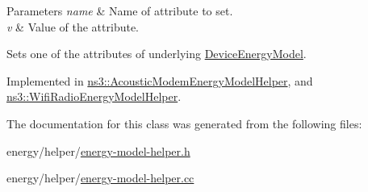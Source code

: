 \begin{DoxyParams}{Parameters}
{\em name} & Name of attribute to set. \\
\hline
{\em v} & Value of the attribute.\\
\hline
\end{DoxyParams}
Sets one of the attributes of underlying \hyperlink{classns3_1_1DeviceEnergyModel}{Device\+Energy\+Model}. 

Implemented in \hyperlink{classns3_1_1AcousticModemEnergyModelHelper_abc6557b5e7806af2a63c88c2c4dfb95e}{ns3\+::\+Acoustic\+Modem\+Energy\+Model\+Helper}, and \hyperlink{classns3_1_1WifiRadioEnergyModelHelper_a8fb76b591e426c6a8fcdc7fc411e3295}{ns3\+::\+Wifi\+Radio\+Energy\+Model\+Helper}.



The documentation for this class was generated from the following files\+:\begin{DoxyCompactItemize}
\item 
energy/helper/\hyperlink{energy-model-helper_8h}{energy-\/model-\/helper.\+h}\item 
energy/helper/\hyperlink{energy-model-helper_8cc}{energy-\/model-\/helper.\+cc}\end{DoxyCompactItemize}
